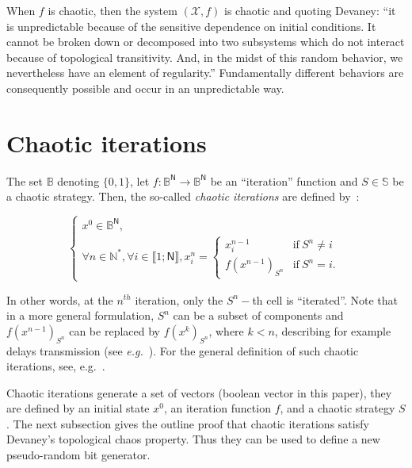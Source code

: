 When $f$ is chaotic, then the system $(\mathcal{X}, f)$ is chaotic and quoting Devaney: ``it is unpredictable because of the sensitive dependence on initial conditions. It cannot be broken down or decomposed into two subsystems which do not interact because of topological transitivity. And, in the midst of this random behavior, we nevertheless have an element of regularity.'' Fundamentally different  behaviors  are  consequently possible and occur in an unpredictable way.




\section{Chaotic iterations}
\label{subsection:Chaotic iterations}

\begin{definition}
\label{Chaotic iterations}
The set $\mathds{B}$ denoting $\{0,1\}$, let $f:\mathds{B}^{\mathsf{N}%
}\longrightarrow \mathds{B}^{\mathsf{N}}$ be an ``iteration'' function and $S\in \mathbb{S}
$ be a chaotic strategy. Then, the so-called \emph{chaotic iterations} are defined by~\cite{Robert1986}:

\begin{equation}
\left\{\begin{array}{l}
x^0\in \mathds{B}^{\mathsf{N}}, \\
\forall n\in \mathds{N}^{\ast },\forall i\in \llbracket1;\mathsf{N}\rrbracket%
,x_i^n=
\left\{
\begin{array}{ll}
x_i^{n-1} & \text{if}~S^n\neq i \\
f(x^{n-1})_{S^n}  & \text{if}~S^n=i.
\end{array} 
\right. 
\end{array}
\right.
\end{equation}
\end{definition}

In other words, at the $n^{th}$ iteration, only the $S^{n}-$th cell is
\textquotedblleft iterated\textquotedblright . Note that in a more general
formulation, $S^n$ can be a subset of components and $f(x^{n-1})_{S^{n}}$ can
be replaced by $f(x^{k})_{S^{n}}$, where $k < n$, describing for
example delays transmission (see \emph{e.g.}~\cite{Bahi2000}). For the
general definition of such chaotic iterations, see, e.g.~\cite{Robert1986}.

Chaotic iterations generate a set of vectors (boolean vector in this paper),
they are defined by an initial state $x^{0}$, an iteration function $f$, and a chaotic strategy $S$.
The next subsection gives the outline proof that chaotic iterations satisfy Devaney's topological chaos property. Thus they can be used to define a new pseudo-random bit generator.

